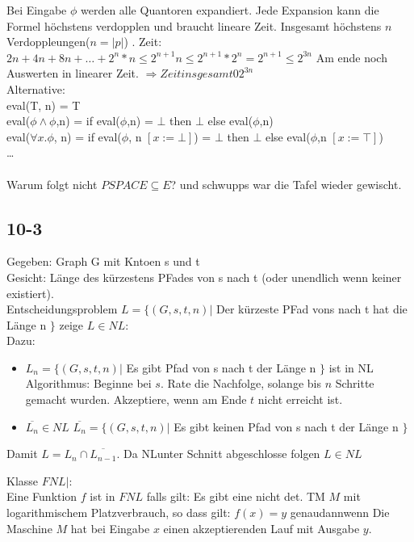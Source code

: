 \documentclass[12pt, oneside, a4paper, numbers=enddot, abstracton, parskip=full]{scrreprt}
\begin{document}
Bei Eingabe $\phi$ werden alle Quantoren expandiert. Jede Expansion
kann die Formel höchstens verdopplen und braucht lineare
Zeit. Insgesamt höchstens $n$ Verdoppleungen($n=|p|$) .
Zeit: $2n + 4n +8n+ \dots + 2^n * n \leq 2^{n+1} n \leq 2^{n+1} * 2^{n} = 2^{n+1} \leq 2^{3n}$
Am ende noch Auswerten in linearer Zeit.
$\Rightarrow Zeit insgesamt \mathcal{0} 2^{3n}$ \\

Alternative:\\
eval(T, n) = T \\
eval($\phi \land \phi$,n) = if eval($\phi$,n) = $\bot$ then $\bot$ else eval($\phi$,n) \\
eval($\forall x.\phi$, n) = if eval($\phi$,  n $[ x:= \bot ]$) = $\bot$ then $\bot$ else eval($\phi$,n $[ x := \top ]$) \\
\dots \\
\\
Warum folgt nicht $PSPACE \subseteq E$? und schwupps war die Tafel wieder gewischt.

\subsection{10-3}
Gegeben: Graph G mit Kntoen s und t \\
Gesicht: Länge des kürzestens PFades von s nach t (oder unendlich wenn keiner existiert). \\

Entscheidungsproblem $L= \{(G,s,t,n) |$ Der kürzeste PFad vons nach t hat die Länge n $\}$
zeige $L\in NL$:\\
Dazu:
\begin{itemize}
\item $L_n = \{(G,s,t,n) |$ Es gibt Pfad von s nach t der Länge n $\}$ ist in NL \\
Algorithmus: Beginne bei $s$. Rate die Nachfolge, solange bis $n$ Schritte
gemacht wurden. Akzeptiere, wenn am Ende $t$ nicht erreicht ist.
\item $\overline{L_n} \in NL$ $\overline{L_n} = \{(G,s,t,n) |$ Es gibt keinen Pfad von s nach t der Länge n $\}$
\end{itemize}

Damit $L=L_n \cap \overline{L_{n-1}}$. Da NLunter Schnitt abgeschlosse folgen $L\in NL$

Klasse $FNL|$:\\
Eine Funktion $f$ ist in $FNL$ falls gilt: Es gibt eine nicht det. TM $M$ mit logarithmischem Platzverbrauch, so dass gilt:
$f(x) = y$ genaudannwenn Die Maschine $M$ hat bei Eingabe $x$ einen akzeptierenden Lauf mit Ausgabe $y$.
\end{document}
